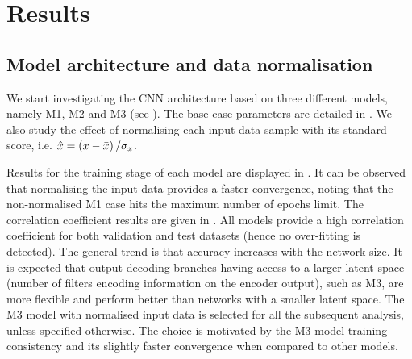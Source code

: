 \documentclass[../main.tex]{subfiles}
\begin{document}
\section{Results}

\subsection{Model architecture and data normalisation}

We start investigating the CNN architecture based on three different models, namely M1, M2 and M3 (see ).
The base-case parameters are detailed in .
We also study the effect of normalising each input data sample with its standard score, i.e. $\hat{x} = \left(x-\bar{x} \right)/\sigma_x$.

Results for the training stage of each model are displayed in .
It can be observed that normalising the input data provides a faster convergence, noting that the non-normalised M1 case hits the maximum number of epochs limit.
The correlation coefficient results are given in .
All models provide a high correlation coefficient for both validation and test datasets (hence no over-fitting is detected).
The general trend is that accuracy increases with the network size.
It is expected that output decoding branches having access to a larger latent space (number of filters encoding information on the encoder output), such as M3, are more flexible and perform better than networks with a smaller latent space.
The M3 model with normalised input data is selected for all the subsequent analysis, unless specified otherwise.
The choice is motivated by the M3 model training consistency and its slightly faster convergence when compared to other models.
\end{document}
